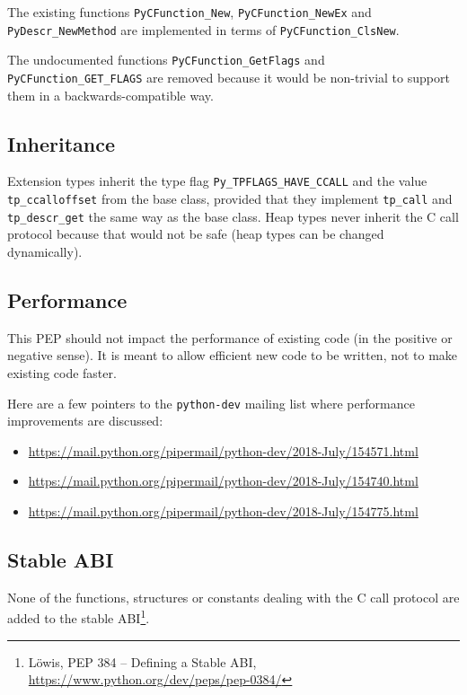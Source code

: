 The existing functions \texttt{PyCFunction\_New},
\texttt{PyCFunction\_NewEx} and \texttt{PyDescr\_NewMethod} are
implemented in terms of \texttt{PyCFunction\_ClsNew}.

The undocumented functions \texttt{PyCFunction\_GetFlags} and
\texttt{PyCFunction\_GET\_FLAGS} are removed because it would be
non-trivial to support them in a backwards-compatible way.

\subsection{Inheritance}

Extension types inherit the type flag \texttt{Py\_TPFLAGS\_HAVE\_CCALL}
and the value \texttt{tp\_ccalloffset} from the base class, provided
that they implement \texttt{tp\_call} and \texttt{tp\_descr\_get} the
same way as the base class. Heap types never inherit the C call protocol
because that would not be safe (heap types can be changed dynamically).

\subsection{Performance}

This PEP should not impact the performance of existing code (in the
positive or negative sense). It is meant to allow efficient new code to
be written, not to make existing code faster.

Here are a few pointers to the \texttt{python-dev} mailing list where
performance improvements are discussed:

\begin{itemize}
\tightlist
\item
  \url{https://mail.python.org/pipermail/python-dev/2018-July/154571.html}
\item
  \url{https://mail.python.org/pipermail/python-dev/2018-July/154740.html}
\item
  \url{https://mail.python.org/pipermail/python-dev/2018-July/154775.html}
\end{itemize}

\subsection{Stable ABI}

None of the functions, structures or constants dealing with the C call
protocol are added to the stable ABI\footnote{Löwis, PEP 384 -- Defining
  a Stable ABI, \url{https://www.python.org/dev/peps/pep-0384/}}.

